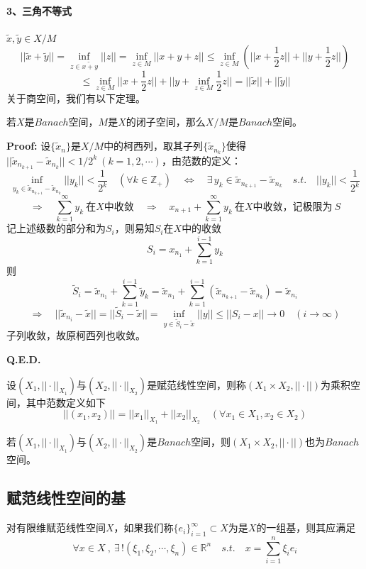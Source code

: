 \paragraph*{3、三角不等式} \quad $\tilde{x},\tilde{y} \in X/M$
\[||\tilde{x}+\tilde{y}||=\mathop \text{inf}\limits_{z \in \tilde{x+y}}||z||=\mathop \text{inf}\limits_{z \in M}||x+y+z|| \leq \mathop \text{inf}\limits_{z \in M}\left(||x+\frac{1}{2}z||+||y+\frac{1}{2}z||\right)\]
\[\leq \mathop \text{inf}\limits_{z \in M}||x+\frac{1}{2}z||+||y+\mathop \text{inf}\limits_{z \in M}\frac{1}{2}z||=||\tilde{x}||+||\tilde{y}||\]
关于商空间，我们有以下定理。
\begin{theorem}
    若$X$是$Banach$空间，$M$是$X$的闭子空间，那么$X/M$是$Banach$空间。
\end{theorem}
\textbf{Proof:} 设$\{\tilde{x}_n\}$是$X/M$中的柯西列，取其子列$\{\tilde{x}_{n_k}\}$使得$||\tilde{x}_{n_{k+1}}-\tilde{x}_{n_k}||<1/2^k \ (k=1,2,\cdots)$，由范数的定义：
\[\mathop \text{inf}\limits_{y_k \in \tilde{x}_{n_{k+1}}-\tilde{x}_{n_k}}||y_k||<\frac{1}{2^k} \quad (\forall k \in \mathbb{Z}_+) \quad \Leftrightarrow \quad \exists \, y_k \in \tilde{x}_{n_{k+1}}-\tilde{x}_{n_k} \quad s.t. \quad ||y_k||<\frac{1}{2^k}\]
\[\Rightarrow \quad \sum_{k=1}^{\infty}y_k \ \text{在$X$中收敛} \quad \Rightarrow \quad x_{n+1}+\sum_{k=1}^{\infty}y_k \ \text{在$X$中收敛，记极限为} \ S\]
记上述级数的部分和为$S_i$，则易知$S_i$在$X$中的收敛
\[S_i=x_{n_1}+\sum_{k=1}^{i-1}y_k\]
则
\[\tilde{S}_i=\tilde{x}_{n_1}+\sum_{k=1}^{i-1}\tilde{y}_k=\tilde{x}_{n_1}+\sum_{k=1}^{i-1}\left(\tilde{x}_{n_{k+1}}-\tilde{x}_{n_k}\right)=\tilde{x}_{n_i}\]
\[\Rightarrow \quad ||\tilde{x}_{n_i}-\tilde{x}||=||\tilde{S}_i-\tilde{x}||=\mathop \text{inf}\limits_{y \in \tilde{S}_i-\tilde{x}}||y|| \leq ||S_i-x||\rightarrow 0 \quad (i \rightarrow \infty)\]
子列收敛，故原柯西列也收敛。

\textbf{Q.E.D.}
\begin{definition}[乘积空间]
    设$(X_1,||\cdot||_{X_1})$与$(X_2,||\cdot||_{X_2})$是赋范线性空间，则称$(X_1 \times X_2,||\cdot||)$为乘积空间，其中范数定义如下
    \[||(x_1,x_2)||=||x_1||_{X_1}+||x_2||_{X_2} \quad (\forall x_1 \in X_1,x_2 \in X_2)\]
\end{definition}
若$(X_1,||\cdot||_{X_1})$与$(X_2,||\cdot||_{X_2})$是$Banach$空间，则$(X_1 \times X_2,||\cdot||)$也为$Banach$空间。

\subsection{赋范线性空间的基} \label{baseset}
对有限维赋范线性空间$X$，如果我们称$\{e_i\}_{i=1}^{\infty} \subset X$为是$X$的一组基，则其应满足
\[\forall x \in X \ , \ \exists \, ! (\xi_1,\xi_2,\cdots,\xi_n) \in \mathbb{R}^n \quad s.t. \quad x=\sum_{i=1}^n\xi_ie_i\]

